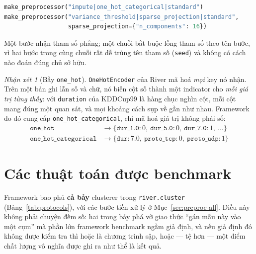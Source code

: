 \documentclass[11pt,a4paper]{article}
\theoremstyle{remark}
\newtheorem{remark}{Nhận xét}
\begin{document}
\begin{lstlisting}[language=Python]
make_preprocessor("impute|one_hot_categorical|standard")
make_preprocessor("variance_threshold|sparse_projection|standard",
                  sparse_projection={"n_components": 16})
\end{lstlisting}

Một bước nhận tham số phẳng; một chuỗi bắt buộc lồng tham số theo tên bước, vì
hai bước trong cùng chuỗi rất dễ trùng tên tham số (\texttt{seed}) và không có
cách nào đoán đúng chủ sở hữu.

\begin{remark}[Bẫy \texttt{one\_hot}]
\label{rem:onehot}
\texttt{OneHotEncoder} của River mã hoá \emph{mọi} key nó nhận. Trên một bản ghi
lẫn số và chữ, nó biến cột số thành một indicator cho \emph{mỗi giá trị từng
thấy}: với \texttt{duration} của KDDCup99 là hàng chục nghìn cột, mỗi cột mang
đúng một quan sát, và mọi khoảng cách sụp về gần như nhau. Framework do đó cung
cấp \texttt{one\_hot\_categorical}, chỉ mã hoá giá trị không phải số:
\[
\begin{array}{ll}
\texttt{one\_hot} & \to \{\texttt{dur\_1.0}: 0,\ \texttt{dur\_5.0}: 0,\ \texttt{dur\_7.0}: 1,\ \dots\}\\
\texttt{one\_hot\_categorical} & \to \{\texttt{dur}: 7.0,\ \texttt{proto\_tcp}: 0,\ \texttt{proto\_udp}: 1\}
\end{array}
\]
\end{remark}

\section{Các thuật toán được benchmark}
\label{sec:algos}

Framework bao phủ \textbf{cả bảy} clusterer trong \texttt{river.cluster}
(Bảng~\ref{tab:protocols}), với các bước tiền xử lý ở Mục~\ref{sec:preproc-all}.
Điều này không phải chuyện đếm số: hai trong bảy phá vỡ giao thức ``gán mẫu này
vào một cụm'' mà phần lớn framework benchmark ngầm giả định, và nếu giả định đó không
được kiểm tra thì hoặc là chương trình sập, hoặc --- tệ hơn --- một điểm chất
lượng vô nghĩa được ghi ra như thể là kết quả.
\end{document}
